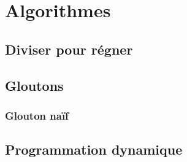 \documentclass[]{article}
\begin{document}
\chapter{Algorithmes}

\section{Diviser pour régner}

\section{Gloutons}

\subsection{Glouton naïf}

\section{Programmation dynamique}
\end{document}
